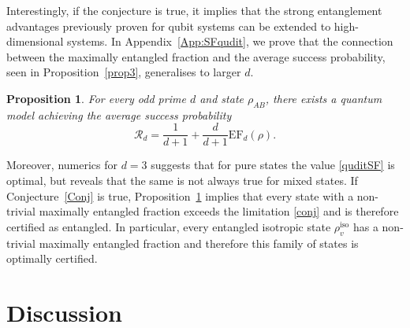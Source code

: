 \documentclass[aps,superscriptaddress,twocolumn,twoside,floatfix,pra,nofootinbib,a4paper]{revtex4-2}
\newtheorem{proposition}{Proposition}
\begin{document}
Interestingly, if the conjecture is true, it implies that the strong entanglement advantages previously proven for qubit systems can be extended to high-dimensional systems. In Appendix~\ref{App:SFqudit}, we prove that the connection between the maximally entangled fraction and the average success probability, seen in Proposition~\ref{prop3}, generalises to larger $d$.
\begin{proposition}\label{prop4}
	For every odd prime $d$ and state $\rho_{AB}$, there exists a quantum model achieving the average success probability
	\begin{equation}\label{quditSF}
	\mathcal{R}_d=\frac{1}{d+1}+\frac{d}{d+1}\text{EF}_d(\rho).
	\end{equation}
\end{proposition}
Moreover, numerics for $d=3$ suggests that for pure states the value \eqref{quditSF} is optimal, but reveals that the same is not always true  for mixed states.  If Conjecture~\ref{Conj} is true, Proposition~\ref{prop4} implies that every state with a non-trivial maximally entangled fraction exceeds the limitation \eqref{conj} and is therefore certified as entangled. In particular, every entangled isotropic state $\rho_v^\text{iso}$ has a non-trivial maximally entangled fraction and therefore this family of states is optimally certified.




\section{Discussion}
\end{document}
